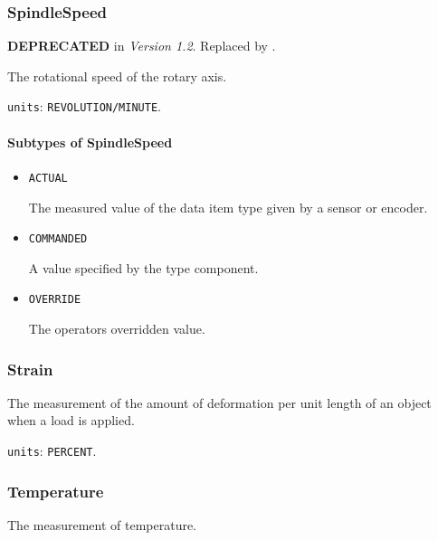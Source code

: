 \subsubsection{SpindleSpeed}
\label{sec:SpindleSpeed}



\textbf{DEPRECATED} in \textit{Version 1.2}.  Replaced by .

The rotational speed of the rotary axis.


\texttt{units}: \texttt{REVOLUTION/MINUTE}.

\paragraph{Subtypes of SpindleSpeed}\mbox{}
\label{sec:Subtypes of SpindleSpeed}

\begin{itemize}

\item \texttt{ACTUAL}


The measured value of the data item type given by a sensor or encoder.

\item \texttt{COMMANDED}


A value specified by the  type component.

\item \texttt{OVERRIDE}


The operators overridden value.


\end{itemize}






\subsubsection{Strain}
\label{sec:Strain}



The measurement of the amount of deformation per unit length of an object when a load is applied.


\texttt{units}: \texttt{PERCENT}.


\subsubsection{Temperature}
\label{sec:Temperature}



The measurement of temperature.


